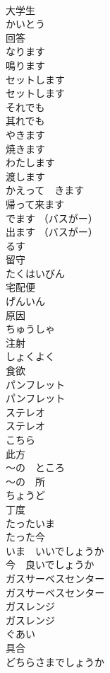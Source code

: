 \documentclass[8pt]{extreport}
\begin{document}
\begin{CJK}{UTF8}{min}
\\	大学生		
\\	かいとう	
\\	回答		
\\	なります	
\\	鳴ります		
\\	セットします	
\\	セットします		
\\	それでも	
\\	其れでも		
\\	やきます	
\\	焼きます	
\\	わたします	
\\	渡します	
\\	かえって　きます	
\\	帰って来ます	
\\	でます （バスがー）	
\\	出ます （バスがー）	
\\	るす	
\\	留守	
\\	たくはいびん	
\\	宅配便		
\\	げんいん	
\\	原因	
\\	ちゅうしゃ	
\\	注射	
\\	しょくよく	
\\	食欲	
\\	パンフレット	
\\	パンフレット		
\\	ステレオ	
\\	ステレオ		
\\	こちら	
\\	此方		
\\	〜の　ところ	
\\	〜の　所		
\\	ちょうど	
\\	丁度	
\\	たったいま	
\\	たった今	
\\	いま　いいでしょうか	
\\	今　良いでしょうか		
\\	ガスサーベスセンター	
\\	ガスサーベスセンター		
\\	ガスレンジ	
\\	ガスレンジ		
\\	ぐあい	
\\	具合		
\\	どちらさまでしょうか	

\end{CJK}
\end{document}
